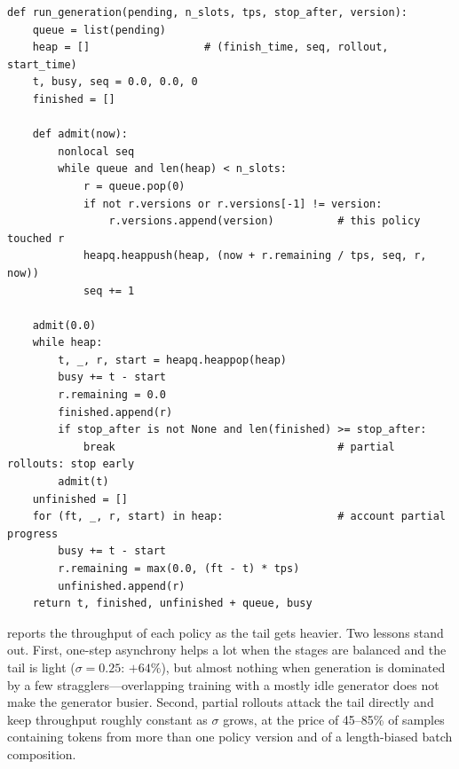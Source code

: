\begin{lstlisting}[caption={Continuous-batching generation with an early-stop for partial
rollouts (from \texttt{llmsys/rlsys/sim.py}).},label={lst:rlsys:rungen}]
def run_generation(pending, n_slots, tps, stop_after, version):
    queue = list(pending)
    heap = []                  # (finish_time, seq, rollout, start_time)
    t, busy, seq = 0.0, 0.0, 0
    finished = []

    def admit(now):
        nonlocal seq
        while queue and len(heap) < n_slots:
            r = queue.pop(0)
            if not r.versions or r.versions[-1] != version:
                r.versions.append(version)          # this policy touched r
            heapq.heappush(heap, (now + r.remaining / tps, seq, r, now))
            seq += 1

    admit(0.0)
    while heap:
        t, _, r, start = heapq.heappop(heap)
        busy += t - start
        r.remaining = 0.0
        finished.append(r)
        if stop_after is not None and len(finished) >= stop_after:
            break                                   # partial rollouts: stop early
        admit(t)
    unfinished = []
    for (ft, _, r, start) in heap:                  # account partial progress
        busy += t - start
        r.remaining = max(0.0, (ft - t) * tps)
        unfinished.append(r)
    return t, finished, unfinished + queue, busy
\end{lstlisting}

 reports the throughput of each policy as the tail gets heavier.
Two lessons stand out. First, one-step asynchrony helps a lot when the stages are balanced and
the tail is light ($\sigma=0.25$: $+64\%$), but almost nothing when generation is dominated by
a few stragglers---overlapping training with a mostly idle generator does not make the
generator busier. Second, partial rollouts attack the tail directly and keep throughput
roughly constant as $\sigma$ grows, at the price of 45--85\% of samples containing tokens from
more than one policy version and of a length-biased batch composition.

